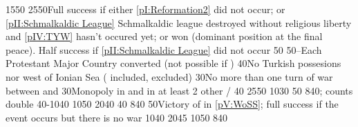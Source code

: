 %
%
{15}{50}{\EU@objPresidiosHIS}%
%
%
{25}{50}{Full success if either \ref{pI:Reformation2} did not occur; or
  \ref{pII:Schmalkaldic League} Schmalkaldic league destroyed without
  religious liberty and \ref{pIV:TYW} hasn't occured yet; or
   won (dominant position at the final peace). Half success
  if \ref{pII:Schmalkaldic League} did not occur}%
%
%
%
{}{50}{\EU@objHalfHungary}%
%
%
{50}{--}{Each Protestant Major Country converted (not possible if \CATHCO)}%
%
%
{}{40}{No Turkish possesions nor \VASSAL west of Ionian Sea
  ( included, \paystripoli excluded)}%
%
%
{}{30}{No more than one turn of war between  and
  }%
%
%
{}{30}{Monopoly in  and in at least 2 other \CTZ/\STZ}%
%
%
%
{}{40}{\EU@objHalfHungary}%
%
%
{25}{50}{\EU@objGermanEmpire}
%
%
{10}{30}{\EU@objBigAustria}%
%
%
{}{50}{\EU@objPortugalAnnexed}%
%
%
{8}{40}{\EU@objMonopolyZone;  counts double}%
%
%
%
{40-10}{40}{}%
%
%
{10}{50}{\EU@objSpanishNetherlands}%
%
%
{20}{40}{\EU@objSpanishWorld}%
%
%
{}{40}{\EU@objPortugalAnnexed}%
%
%
{8}{40}{\EU@objMonopolyZone}%
%
%
%
{}{50}{Victory of \paysmajeurEspagne in \ref{pV:WoSS}; full success if the
  event occurs but there is no war}%
%
%
{10}{40}{\EU@objOuterProvinces}%
%
%
{20}{45}{\EU@objSpanishWorld}%
%
%
{10}{50}{\EU@objPresidiosHIS}%
%
%
{8}{40}{\EU@objMonopolyZone}%
